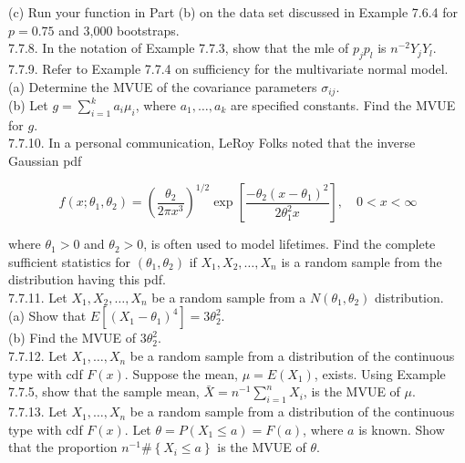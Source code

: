 (c) Run your function in Part (b) on the data set discussed in Example 7.6.4 for $p=0.75$ and 3,000 bootstraps.\\
7.7.8. In the notation of Example 7.7.3, show that the mle of $p_{j} p_{l}$ is $n^{-2} Y_{j} Y_{l}$.\\
7.7.9. Refer to Example 7.7.4 on sufficiency for the multivariate normal model.\\
(a) Determine the MVUE of the covariance parameters $\sigma_{i j}$.\\
(b) Let $g=\sum_{i=1}^{k} a_{i} \mu_{i}$, where $a_{1}, \ldots, a_{k}$ are specified constants. Find the MVUE for $g$.\\
7.7.10. In a personal communication, LeRoy Folks noted that the inverse Gaussian pdf


\begin{equation*}
f\left(x ; \theta_{1}, \theta_{2}\right)=\left(\frac{\theta_{2}}{2 \pi x^{3}}\right)^{1 / 2} \exp \left[\frac{-\theta_{2}\left(x-\theta_{1}\right)^{2}}{2 \theta_{1}^{2} x}\right], \quad 0<x<\infty \tag{7.7.9}
\end{equation*}


where $\theta_{1}>0$ and $\theta_{2}>0$, is often used to model lifetimes. Find the complete sufficient statistics for $\left(\theta_{1}, \theta_{2}\right)$ if $X_{1}, X_{2}, \ldots, X_{n}$ is a random sample from the distribution having this pdf.\\
7.7.11. Let $X_{1}, X_{2}, \ldots, X_{n}$ be a random sample from a $N\left(\theta_{1}, \theta_{2}\right)$ distribution.\\
(a) Show that $E\left[\left(X_{1}-\theta_{1}\right)^{4}\right]=3 \theta_{2}^{2}$.\\
(b) Find the MVUE of $3 \theta_{2}^{2}$.\\
7.7.12. Let $X_{1}, \ldots, X_{n}$ be a random sample from a distribution of the continuous type with cdf $F(x)$. Suppose the mean, $\mu=E\left(X_{1}\right)$, exists. Using Example 7.7.5, show that the sample mean, $\bar{X}=n^{-1} \sum_{i=1}^{n} X_{i}$, is the MVUE of $\mu$.\\
7.7.13. Let $X_{1}, \ldots, X_{n}$ be a random sample from a distribution of the continuous type with cdf $F(x)$. Let $\theta=P\left(X_{1} \leq a\right)=F(a)$, where $a$ is known. Show that the proportion $n^{-1} \#\left\{X_{i} \leq a\right\}$ is the MVUE of $\theta$.

